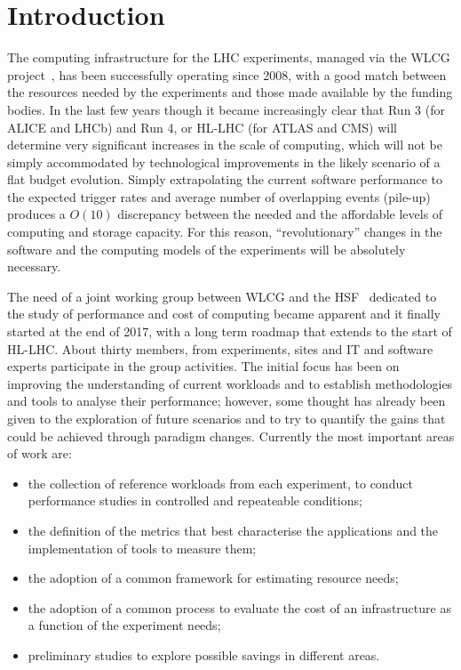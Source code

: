 \section{Introduction}
The computing infrastructure for the LHC experiments, managed via the
WLCG project~\cite{wlcg}, has been successfully operating since 2008,
with a good match between the resources needed by the experiments and
those made available by the funding bodies. In the last few years
though it became increasingly clear that Run 3 (for ALICE and LHCb)
and Run 4, or HL-LHC (for ATLAS and CMS) will determine very
significant increases in the scale of computing, which will not be
simply accommodated by technological improvements in the likely
scenario of a flat budget evolution. Simply extrapolating the current
software performance to the expected trigger rates and average number of overlapping events (pile-up)
produces a $O(10)$ discrepancy between the needed and the affordable
levels of computing and storage capacity. For this reason,
``revolutionary'' changes in the software and the computing models of
the experiments will be absolutely necessary.

The need of a joint working group between WLCG and the
HSF~\cite{hsf} dedicated to the study of performance and cost of
computing became apparent and it finally started at the end of
2017, with a long term roadmap that extends to the start of
HL-LHC. About thirty members, from experiments, sites and IT and software
experts participate in the group activities. The initial focus has
been on improving the understanding of current workloads and to
establish methodologies and tools to analyse their performance; however,
some thought has already been given to the exploration of future
scenarios and to try to quantify the gains that could be achieved
through paradigm changes. Currently the most important areas of work are:
\begin{itemize}
\item the collection of reference workloads from each experiment, to conduct
  performance studies in controlled and repeateable conditions;
\item the definition of the metrics that best characterise the applications and the implementation of tools to measure them;
\item the adoption of a common framework for estimating resource needs;
\item the adoption of a common process to evaluate the cost of an infrastructure
  as a function of the experiment needs;
\item preliminary studies to explore possible savings in different areas.
\end{itemize}

